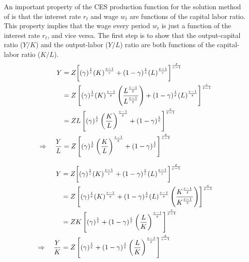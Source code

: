     An important property of the CES production function for the solution method of \ogindia is that the interest rate $r_t$ and wage $w_t$ are functions of the capital labor ratio. This property implies that the wage every period $w_t$ is just a function of the interest rate $r_t$, and vice versa. The first step is to show that the output-capital ratio ($Y/K$) and the output-labor ($Y/L$) ratio are both functions of the capital-labor ratio ($K/L$).
    \begin{equation}\label{EqAppDerivCES_YL}
      \begin{split}
      Y &= Z\biggl[(\gamma)^\frac{1}{\varepsilon}(K)^\frac{\varepsilon-1}{\varepsilon} + (1-\gamma)^\frac{1}{\varepsilon}(L)^\frac{\varepsilon-1}{\varepsilon}\biggr]^\frac{\varepsilon}{\varepsilon-1} \\
      &= Z\left[(\gamma)^\frac{1}{\varepsilon}(K)^\frac{\varepsilon-1}{\varepsilon}\left(\frac{L^\frac{\varepsilon-1}{\varepsilon}}{L^\frac{\varepsilon-1}{\varepsilon}}\right) + (1-\gamma)^\frac{1}{\varepsilon}(L)^\frac{\varepsilon-1}{\varepsilon}\right]^\frac{\varepsilon}{\varepsilon-1} \\
      &= ZL\left[(\gamma)^\frac{1}{\varepsilon}\left(\frac{K}{L}\right)^\frac{\varepsilon-1}{\varepsilon} + (1-\gamma)^\frac{1}{\varepsilon}\right]^\frac{\varepsilon}{\varepsilon-1} \\
      \Rightarrow\quad \frac{Y}{L} &= Z\left[(\gamma)^\frac{1}{\varepsilon}\left(\frac{K}{L}\right)^\frac{\varepsilon-1}{\varepsilon} + (1-\gamma)^\frac{1}{\varepsilon}\right]^\frac{\varepsilon}{\varepsilon-1}
      \end{split}
    \end{equation}

    \begin{equation}\label{EqAppDerivCES_YK}
      \begin{split}
      Y &= Z\biggl[(\gamma)^\frac{1}{\varepsilon}(K)^\frac{\varepsilon-1}{\varepsilon} + (1-\gamma)^\frac{1}{\varepsilon}(L)^\frac{\varepsilon-1}{\varepsilon}\biggr]^\frac{\varepsilon}{\varepsilon-1} \\
      &= Z\left[(\gamma)^\frac{1}{\varepsilon}(K)^\frac{\varepsilon-1}{\varepsilon} + (1-\gamma)^\frac{1}{\varepsilon}(L)^\frac{\varepsilon-1}{\varepsilon}\left(\frac{K^\frac{\varepsilon-1}{\varepsilon}}{K^\frac{\varepsilon-1}{\varepsilon}}\right)\right]^\frac{\varepsilon}{\varepsilon-1} \\
      &= ZK\left[(\gamma)^\frac{1}{\varepsilon} + (1-\gamma)^\frac{1}{\varepsilon}\left(\frac{L}{K}\right)^\frac{\varepsilon-1}{\varepsilon}\right]^\frac{\varepsilon}{\varepsilon-1} \\
      \Rightarrow\quad \frac{Y}{K} &= Z\left[(\gamma)^\frac{1}{\varepsilon} + (1-\gamma)^\frac{1}{\varepsilon}\left(\frac{L}{K}\right)^\frac{\varepsilon-1}{\varepsilon}\right]^\frac{\varepsilon}{\varepsilon-1}
      \end{split}
    \end{equation}

